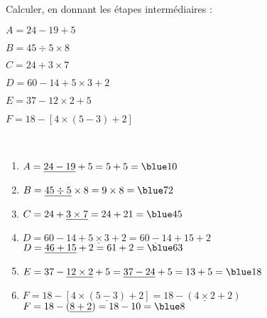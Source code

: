 \begin{exercice} %
   Calculer, en donnant les étapes intermédiaires :

   \begin{minipage}{0.4\linewidth}
     \begin{list}{}{}
        \item $A=24-19+5$
        \item $B=45\div5\times8$
        \item $C=24+3\times7$        
      \end{list}
   \end{minipage}
   \begin{minipage}{0.6\linewidth}
      \begin{list}{}{}
         \item $D=60-14+5\times3+2$
         \item $E=37-12\times2+5$
         \item $F=18-[4\times(5-3)+2]$
       \end{list}
   \end{minipage}

  \end{exercice}
  
  \begin{corrige}
     \ \\ [-5mm]
     \begin{enumerate}
        \item $A=\underline{24-19}+5 =5+5 =\blue 10$ \smallskip
        \item $B=\underline{45\div5}\times8 =9\times8 =\blue 72$ \smallskip
        \item $C=24+\underline{3\times7} =24+21 =\blue 45$ \smallskip
        \item $D=60-14+\underline{5\times3}+2 =\underline{60-14}+15+2$ \\
           $D=\underline{46+15}+2 =61+2 =\blue 63$ \smallskip
        \item $E=37-\underline{12\times2}+5 =\underline{37-24}+5 =13+5 =\blue 18$ \smallskip
        \item $F=18-[4\times(\underline{5-3})+2] =18-(\underline{4\times2}+2)$ \\
           $F=18-(\underline{8+2}) =18-10 =\blue 8$
     \end{enumerate}
  \end{corrige}